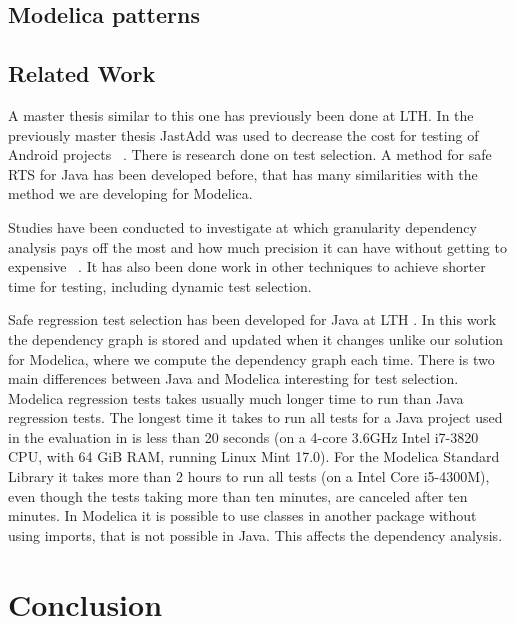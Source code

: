 \documentclass{cslthse-msc}
\begin{document}
\section{Modelica patterns}


\section{Related Work}
A master thesis similar to this one has previously been done at LTH. In the previously master thesis JastAdd was used to decrease the cost for testing of Android projects ~\cite{kampe2012dependroid}. There is research done on test selection. A method for safe RTS for Java has been developed before, that has many similarities with the method we are developing for Modelica. 

Studies have been conducted to investigate at which granularity dependency analysis pays off the most and how much precision it can have without getting to expensive ~\cite{DBLP:conf/sigsoft/LegunsenHSLZM16}. It has also been done work in other techniques to achieve shorter time for testing, including dynamic test selection.

Safe regression test selection has been developed for Java at LTH \cite{DBLP:conf/pppj/OqvistHM16}. In this work the dependency graph is stored and updated when it changes unlike our solution for Modelica, where we compute the dependency graph each time. There is two main differences between Java and Modelica interesting for test selection. Modelica regression tests takes usually much longer time to run than Java regression tests. The longest time it takes to run all tests for a Java project used in the evaluation in \cite{DBLP:conf/pppj/OqvistHM16} is less than 20 seconds (on a 4-core 3.6GHz Intel i7-3820 CPU, with 64 GiB RAM, running Linux Mint 17.0). For the Modelica Standard Library it takes more than 2 hours to run all tests (on a Intel Core i5-4300M), even though the tests taking more than ten minutes, are canceled after ten minutes. In Modelica it is possible to use classes in another package without using imports, that is not possible in Java. This affects the dependency analysis.

\chapter[Conclusion]{Conclusion}
\end{document}
